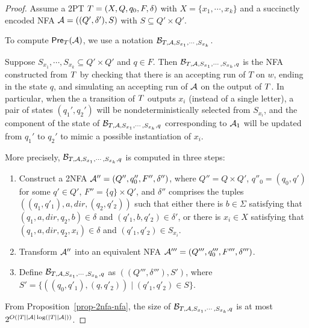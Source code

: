 \begin{proof}
Assume a 2PT $T=(X, Q, q_0, F, \delta)$ with $X = \{x_1,\cdots, x_k\}$ and a succinctly encoded NFA $\mathcal{A} = ((Q', \delta'), S)$ with $S \subseteq Q' \times Q'$. %

To compute $\textsf{Pre}_{T}(\mathcal{A})$, we use a notation $\mathcal{B}_{T, \mathcal{A}, S_{x_1}, \cdots, S_{x_k}}$. 

Suppose $S_{x_1}, \cdots, S_{x_k} \subseteq Q' \times Q'$ and $q \in F$. %
%
Then $\mathcal{B}_{T, \mathcal{A}, S_{x_1}, \cdots, S_{x_k}, q}$ is the NFA constructed from $T$  by checking that there is an accepting run of $T$ on $w$, ending in the state $q$, and simulating an accepting run of $\mathcal{A}$ on the output of $T$. In particular, when the a transition of $T$ outputs $x_i$ (instead of a single letter), a pair of states $(q_1', q_2')$ will be nondeterministically selected from $S_{x_i}$, and the component of the state of $\mathcal{B}_{T, \mathcal{A}, S_{x_1}, \cdots, S_{x_k}, q}$ corresponding to $\mathcal{A}_1$ will be updated from $q_1'$ to $q_2'$ to mimic a possible instantiation of $x_i$.  



More precisely, $\mathcal{B}_{T, \mathcal{A}, S_{x_1}, \cdots, S_{x_k}, q}$ is computed in three steps:
\begin{enumerate} 
\item Construct a 2NFA $\mathcal{A}'' = (Q'', q''_{0}, F'', \delta'')$, where $Q'' = Q \times Q'$, $q''_0 = (q_0, q')$ for some $q' \in Q'$, $F'' = \{q\} \times Q'$, and $\delta''$ comprises the tuples $((q_1, q'_1), a, dir, (q_2, q'_2))$ such that either there is $b \in \Sigma$ satisfying that $(q_1, a, dir, q_2, b) \in \delta$ and $(q'_1, b, q'_2) \in \delta'$, or there is $x_i \in X$ satisfying that $(q_1, a, dir, q_2, x_i) \in \delta$  and $(q'_1, q'_2) \in S_{x_i}$.
%
\item Transform $\mathcal{A}''$ into an equivalent NFA $\mathcal{A}''' = (Q''', q'''_{0}, F''', \delta''')$.
%
\item Define $\mathcal{B}_{T, \mathcal{A}, S_{x_1}, \cdots, S_{x_k}, q}$ as $((Q''', \delta'''), S')$, where $S' = \{((q_0,q'_1), (q,q'_2)) \mid (q'_1,q'_2) \in S\}$.
\end{enumerate} 
From Proposition~\ref{prop-2nfa-nfa}, the size of $\mathcal{B}_{T, \mathcal{A}, S_{x_1}, \cdots, S_{x_k}, q}$ is at most 
$2^{O(|T||\mathcal{A}| \log(|T||\mathcal{A}|))}$.   


\end{proof}
